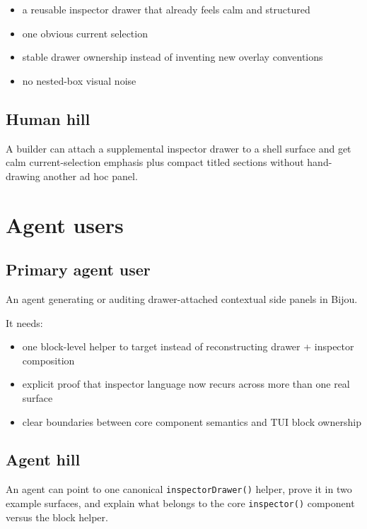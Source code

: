 \begin{itemize}
\tightlist
\item
  a reusable inspector drawer that already feels calm and structured
\item
  one obvious current selection
\item
  stable drawer ownership instead of inventing new overlay conventions
\item
  no nested-box visual noise
\end{itemize}

\subsection{Human hill}\label{record-174-human-hill}

A builder can attach a supplemental inspector drawer to a shell surface and get calm current-selection emphasis plus compact titled sections without hand-drawing another ad hoc panel.

\section{Agent users}\label{record-174-agent-users}

\subsection{Primary agent user}\label{record-174-primary-agent-user}

An agent generating or auditing drawer-attached contextual side panels in Bijou.

It needs:

\begin{itemize}
\tightlist
\item
  one block-level helper to target instead of reconstructing drawer + inspector composition
\item
  explicit proof that inspector language now recurs across more than one real surface
\item
  clear boundaries between core component semantics and TUI block ownership
\end{itemize}

\subsection{Agent hill}\label{record-174-agent-hill}

An agent can point to one canonical \texttt{i\allowbreak{}n\allowbreak{}s\allowbreak{}p\allowbreak{}e\allowbreak{}c\allowbreak{}t\allowbreak{}o\allowbreak{}r\allowbreak{}D\allowbreak{}r\allowbreak{}a\allowbreak{}w\allowbreak{}e\allowbreak{}r\allowbreak{}(\allowbreak{})} helper, prove it in two example surfaces, and explain what belongs to the core \texttt{i\allowbreak{}n\allowbreak{}s\allowbreak{}p\allowbreak{}e\allowbreak{}c\allowbreak{}t\allowbreak{}o\allowbreak{}r\allowbreak{}(\allowbreak{})} component versus the block helper.

